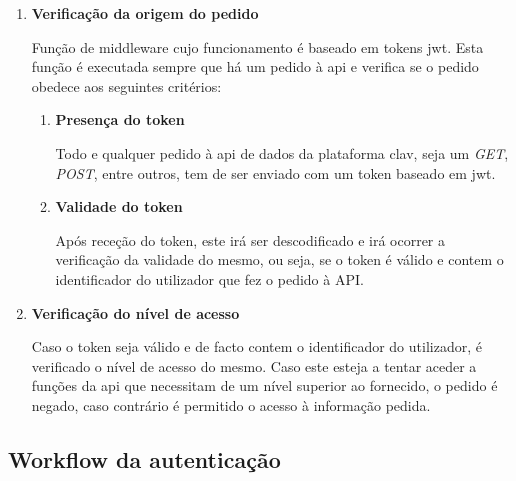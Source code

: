 \begin{enumerate}
    \item \textbf{Verificação da origem do pedido}
    
    Função de middleware cujo funcionamento é baseado em tokens \gls{jwt}. Esta função é executada sempre que há um pedido à \gls{api} e verifica se o pedido obedece aos seguintes critérios:

    \begin{enumerate}
        \item \textbf{Presença do token}
        
        Todo e qualquer pedido à \gls{api} de dados da plataforma \gls{clav}, seja um \emph{GET}, \emph{POST}, entre outros, tem de ser enviado com um token baseado em \gls{jwt}.
        
        \item \textbf{Validade do token}
        
        Após receção do token, este irá ser descodificado e irá ocorrer a verificação da validade do mesmo, ou seja, se o token é válido e contem o identificador do utilizador que fez o pedido à API.
    \end{enumerate}
    
    \item \textbf{Verificação do nível de acesso}
    
    Caso o token seja válido e de facto contem o identificador do utilizador, é verificado o nível de acesso do mesmo. Caso este esteja a tentar aceder a funções da \gls{api} que necessitam de um nível superior ao fornecido, o pedido é negado, caso contrário é permitido o acesso à informação pedida. 
\end{enumerate}

\cleardoublepage
\subsection{Workflow da autenticação}

